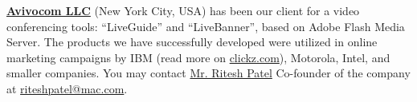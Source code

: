 
\textbf{\href{http://www.avivocom.com}{Avivocom LLC}} (New York City, USA) has been 
our client for a video conferencing tools:
``LiveGuide'' and ``LiveBanner'', based on
Adobe Flash Media Server. The products we have
successfully developed were utilized in online marketing
campaigns by IBM (read more on 
\href{http://www.clickz.com/clickz/news/1691715/ibm-campaign-uses-in-banner-video-chat}{clickz.com}),
Motorola, Intel, and smaller companies. 
You may contact 
\href{http://www.madisonavenuejournal.com/2007/01/01/ritesh_patel/}{Mr. Ritesh Patel}
Co-founder of the company at
\href{mailto:riteshpatel@mac.com}{riteshpatel@mac.com}.
